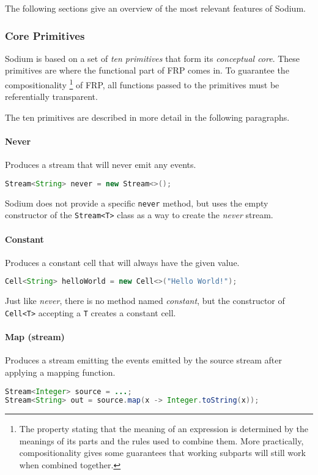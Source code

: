 The following sections give an overview of the most relevant features of Sodium.

\subsubsection{Core Primitives}

Sodium is based on a set of \textit{ten primitives} that form its \textit{conceptual core}.
%
These primitives are where the functional part of FRP comes in.
%
To guarantee the compositionality
%
\footnote
{
  The property stating that the meaning of an expression is determined by the meanings of its parts and the rules used to combine them.
  More practically, compositionality gives some guarantees that working subparts will still work when combined together.
}
%
of FRP, all functions passed to the primitives must be referentially transparent.

The ten primitives are described in more detail in the following paragraphs.

\paragraph{Never}
Produces a stream that will never emit any events.
%
\begin{lstlisting}[frame=single, language=java]
Stream<String> never = new Stream<>();
\end{lstlisting}
%
Sodium does not provide a specific \texttt{never} method, but uses the empty constructor of the \texttt{Stream<T>} class as a way to create the \textit{never} stream.

\paragraph{Constant}
Produces a constant cell that will always have the given value.
%
\begin{lstlisting}[frame=single, language=java]
Cell<String> helloWorld = new Cell<>("Hello World!");
\end{lstlisting}
%
Just like \textit{never}, there is no method named \textit{constant}, but the constructor of \texttt{Cell<T>} accepting a \texttt{T} creates a constant cell.

\paragraph{Map (stream)}
Produces a stream emitting the events emitted by the source stream after applying a mapping function.
%
\begin{lstlisting}[frame=single, language=java]
Stream<Integer> source = ...;
Stream<String> out = source.map(x -> Integer.toString(x));
\end{lstlisting}  

